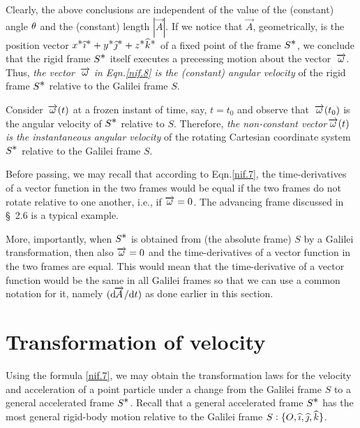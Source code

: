 Clearly, the above conclusions are independent of the 
value of the (constant) angle ${\theta}$ and the (constant) 
length $|\vec{A}|$. If we notice that $\vec{A}$, 
geometrically, is the position vector 
$x^{{\textstyle \ast}}{\widehat{\imath}}^{{\textstyle \ast}}+ y^{{\textstyle \ast}}{\widehat{\jmath}}^{{\textstyle \ast}}+ 
z^{{\textstyle \ast}}{\widehat{k}}^{{\textstyle \ast}}$ of a fixed  point of the frame 
$S^{\textstyle \ast}$, we conclude that the rigid frame $S^{\textstyle \ast}$ 
itself executes a precessing motion about the vector 
$\,\overrightarrow{{\omega}}$. Thus, \textsl{the vector $\,\overrightarrow{{\omega}}$ 
in Eqn.\eqref{nif.8} is the (constant) angular 
velocity} of the rigid frame $S^{\textstyle \ast}$ relative to the 
Galilei frame $S$.

 Consider $\,\overrightarrow{{\omega}}(t)$ at a frozen 
instant of time, say, $t=t_0$ and observe that 
$\,\overrightarrow{{\omega}}(t_0)$ is the angular velocity of $S^{\textstyle \ast}$ 
relative to $S$.  Therefore, \textsl{the non-constant 
vector$\,\overrightarrow{{\omega}}(t)$ is the instantaneous angular 
velocity} of the rotating Cartesian coordinate system 
$S^{{\textstyle \ast}}$ relative to the Galilei frame 
$S$.\vspace{1\bsk}

Before passing, we may recall that 
according to Eqn.\eqref{nif.7}, the time-derivatives of 
a vector function in the two frames would be equal if 
the two frames do not rotate relative to one another, 
i.e., if $\overrightarrow{{\omega}}=0$. The advancing frame discussed 
in \S~2.6 is a typical example. \vspace{1\bsk}

More, importantly, when $S^{\textstyle \ast}$ is 
obtained from (the absolute frame) $S$ by a Galilei 
transformation, then also $\overrightarrow{{\omega}}=0$ and the 
time-derivatives of a vector function in the two frames 
are equal. This would mean that the time-derivative of 
a vector function would be the same in all Galilei 
frames so that we can use a common notation for it, 
namely $(\mathrm{d}\negthinspace{\overrightarrow{A}}/\mathrm{d}{t})$ as done earlier in this 
section. 

\vspace{-.3cm}

\section{Transformation of velocity}
 Using the formula 
\eqref{nif.7}, we may obtain the transformation laws 
for  the velocity and acceleration of a point particle 
under a change from the Galilei frame $S$ to a general 
accelerated frame $S^{\textstyle \ast}$. Recall that a {general 
accelerated frame} $S^{\textstyle \ast}$ has the most general 
rigid-body motion relative to the Galilei frame $S:\{O, 
{\widehat{\imath}}, {\widehat{\jmath}}, {\widehat{k}} \}$.


